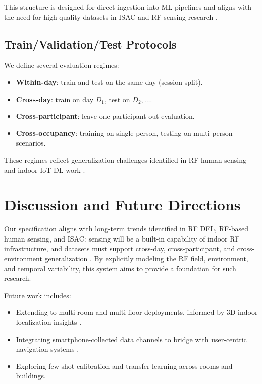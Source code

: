 \documentclass[11pt,a4paper]{article}
\begin{document}
This structure is designed for direct ingestion into ML pipelines and aligns with the need for high-quality datasets in ISAC and RF sensing research \cite{wang2022isac}.

\subsection{Train/Validation/Test Protocols}

We define several evaluation regimes:

\begin{itemize}[leftmargin=*]
\item \textbf{Within-day}: train and test on the same day (session split).
\item \textbf{Cross-day}: train on day $D_1$, test on $D_2,\dots$.
\item \textbf{Cross-participant}: leave-one-participant-out evaluation.
\item \textbf{Cross-occupancy}: training on single-person, testing on multi-person scenarios.
\end{itemize}

These regimes reflect generalization challenges identified in RF human sensing and indoor IoT DL work \cite{shahbazian2023human,abdelbasset2021indoor}.

\section{Discussion and Future Directions}

Our specification aligns with long-term trends identified in RF DFL, RF-based human sensing, and ISAC: sensing will be a built-in capability of indoor RF infrastructure, and datasets must support cross-day, cross-participant, and cross-environment generalization \cite{denis2019dfl,shahbazian2023human,wang2022isac,du2023bf}. By explicitly modeling the RF field, environment, and temporal variability, this system aims to provide a foundation for such research.

Future work includes:

\begin{itemize}[leftmargin=*]
\item Extending to multi-room and multi-floor deployments, informed by 3D indoor localization insights \cite{sesyuk2022indoor}.
\item Integrating smartphone-collected data channels to bridge with user-centric navigation systems \cite{retscher2022indoor}.
\item Exploring few-shot calibration and transfer learning across rooms and buildings.
\end{itemize}
\end{document}
